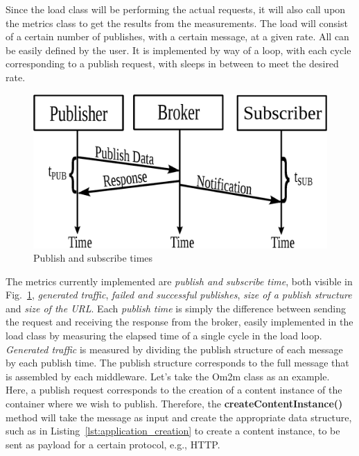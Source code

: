 \documentclass[conference]{IEEEtran}
\begin{document}
Since the load class will be performing the actual requests, it will also call upon the metrics class to get the results from the measurements. The load will consist of a certain number of publishes, with a certain message, at a given rate. All can be easily defined by the user. It is implemented by way of a loop, with each cycle corresponding to a publish request, with sleeps in between to meet the desired rate.

\begin{figure}[htbp!]
  \centering
  \includegraphics[width=\linewidth]{figures/pub_sub_time.eps}
  \caption{Publish and subscribe times~\cite{cardoso_benchmarking_2017}}
  \label{fig:pub_sub_time}
\end{figure}

The metrics currently implemented are \textit{publish and subscribe time}, both visible in Fig.~\ref{fig:pub_sub_time}, \textit{generated traffic}, \textit{failed and successful publishes}, \textit{size of a publish structure} and \textit{size of the URL}. Each \textit{publish time} is simply the difference between sending the request and receiving the response from the broker, easily implemented in the load class by measuring the elapsed time of a single cycle in the load loop.
\textit{Generated traffic} is measured by dividing the publish structure of each message by each publish time. The publish structure corresponds to the full message that is assembled by each middleware. Let's take the Om2m class as an example. Here, a publish request corresponds to the creation of a content instance of the container where we wish to publish. Therefore, the \textbf{createContentInstance()} method will take the message as input and create the appropriate data structure, such as in Listing~\ref{lst:application_creation} to create a content instance, to be sent as payload for a certain protocol, e.g., HTTP\@.
\end{document}
